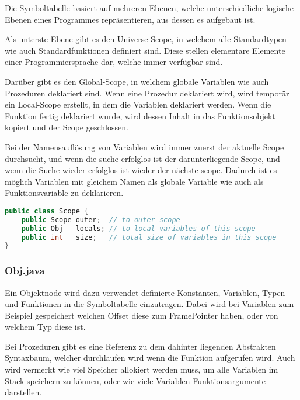 Die Symboltabelle basiert auf mehreren Ebenen, welche unterschiedliche logische Ebenen eines Programmes repr\"asentieren, aus dessen es aufgebaut ist.

Als unterste Ebene gibt es den Universe-Scope, in welchem alle Standardtypen wie auch Standardfunktionen definiert sind. Diese stellen elementare Elemente einer Programmiersprache dar, welche immer verf\"ugbar sind.

Dar\"uber gibt es den Global-Scope, in welchem globale Variablen wie auch Prozeduren deklariert sind. Wenn eine Prozedur deklariert wird, wird tempor\"ar ein Local-Scope erstellt, in dem die Variablen deklariert werden. Wenn die Funktion fertig deklariert wurde, wird dessen Inhalt in das Funktionsobjekt kopiert und der Scope geschlossen.

Bei der Namensaufl\"osung von Variablen wird immer zuerst der aktuelle Scope durchsucht, und wenn die suche erfolglos ist der darunterliegende Scope, und wenn die Suche wieder erfolglos ist wieder der n\"achste scope. Dadurch ist es m\"oglich Variablen mit gleichem Namen als globale Variable wie auch als Funktionsvariable zu deklarieren.

\begin{lstlisting}[language=Java]
public class Scope {
	public Scope outer;  // to outer scope
	public Obj   locals; // to local variables of this scope
	public int   size;   // total size of variables in this scope
}
\end{lstlisting}

\subsubsection{Obj.java}

Ein Objektnode wird dazu verwendet definierte Konstanten, Variablen, Typen und Funktionen in die Symboltabelle einzutragen. Dabei wird bei Variablen zum Beispiel gespeichert welchen Offset diese zum FramePointer haben, oder von welchem Typ diese ist.

Bei Prozeduren gibt es eine Referenz zu dem dahinter liegenden Abstrakten Syntaxbaum, welcher durchlaufen wird wenn die Funktion aufgerufen wird. Auch wird vermerkt wie viel Speicher allokiert werden muss, um alle Variablen im Stack speichern zu k\"onnen, oder wie viele Variablen Funktionsargumente darstellen.

